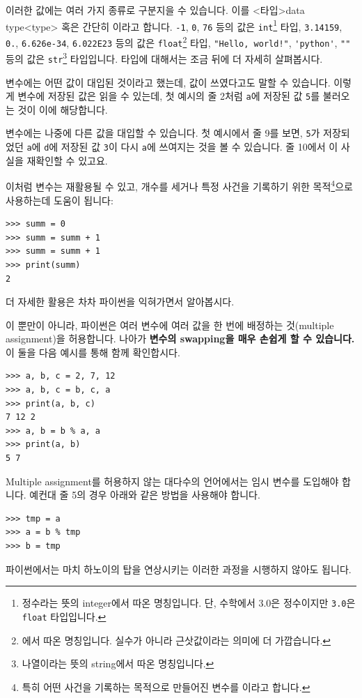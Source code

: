 \documentclass[../main.tex]{subfiles}
\begin{document}
이러한 값에는 여러 가지 종류로 구분지을 수 있습니다.
이를 <타입>{data type}<type> 혹은 간단히 이라고 합니다.
\verb/-1/, \verb/0/, \verb/76/ 등의 값은 \verb/int/\footnote{정수라는 뜻의 integer에서 따온 명칭입니다. 단, 수학에서 3.0은 정수이지만 \texttt{3.0}은 \texttt{float} 타입입니다.} 타입, \verb/3.14159/, \verb/0./, \verb/6.626e-34/, \verb/6.022E23/ 등의 값은 \verb/float/\footnote{에서 따온 명칭입니다. 실수가 아니라 근삿값이라는 의미에 더 가깝습니다.} 타입, \verb/"Hello, world!"/, \verb/'python'/, \verb/""/ 등의 값은 \texttt{str}\footnote{나열이라는 뜻의 string에서 따온 명칭입니다.} 타입입니다.
타입에 대해서는 조금 뒤에 더 자세히 살펴봅시다.

변수에는 어떤 값이 대입된 것이라고 했는데, 값이 쓰였다고도 말할 수 있습니다.
이렇게 변수에 저장된 값은 읽을 수 있는데, 첫 예시의 줄 2처럼 \verb/a/에 저장된 값 \verb/5/를 불러오는 것이 이에 해당합니다.

변수에는 나중에 다른 값을 대입할 수 있습니다.
첫 예시에서 줄 9를 보면, \verb/5/가 저장되었던 \verb/a/에 \verb/d/에 저장된 값 \verb/3/이 다시 \verb/a/에 쓰여지는 것을 볼 수 있습니다.
줄 10에서 이 사실을 재확인할 수 있고요.

이처럼 변수는 재활용될 수 있고, 개수를 세거나 특정 사건을 기록하기 위한 목적\footnote{특히 어떤 사건을 기록하는 목적으로 만들어진 변수를 이라고 합니다.}으로 사용하는데 도움이 됩니다:
\begin{verbatim}
>>> summ = 0
>>> summ = summ + 1
>>> summ = summ + 1
>>> print(summ)
2
\end{verbatim}
더 자세한 활용은 차차 파이썬을 익혀가면서 알아봅시다.

이 뿐만이 아니라, 파이썬은 여러 변수에 여러 값을 한 번에 배정하는 것(multiple assignment)을 허용합니다.
나아가 \textbf{변수의 swapping을 매우 손쉽게 할 수 있습니다.}
이 둘을 다음 예시를 통해 함께 확인합시다.
\begin{verbatim}
>>> a, b, c = 2, 7, 12
>>> a, b, c = b, c, a
>>> print(a, b, c)
7 12 2
>>> a, b = b % a, a
>>> print(a, b)
5 7
\end{verbatim}
Multiple assignment를 허용하지 않는 대다수의 언어에서는 임시 변수를 도입해야 합니다.
예컨대 줄 5의 경우 아래와 같은 방법을 사용해야 합니다.
\begin{verbatim}
>>> tmp = a
>>> a = b % tmp
>>> b = tmp
\end{verbatim}
파이썬에서는 마치 하노이의 탑을 연상시키는 이러한 과정을 시행하지 않아도 됩니다.
\end{document}
